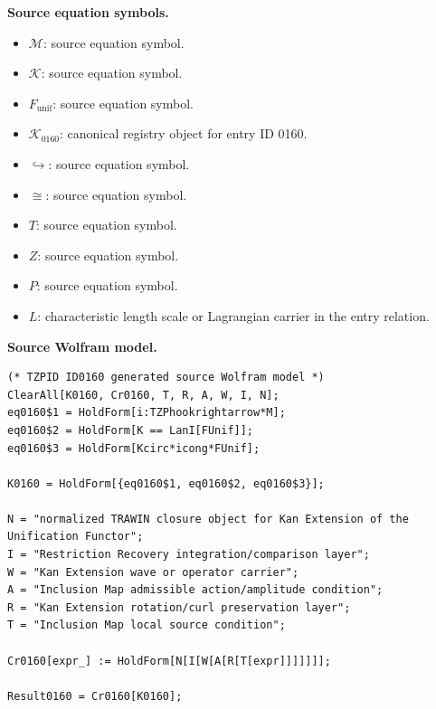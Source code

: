 \begin{minipage}[t]{0.49\linewidth}
\begingroup
\small
\raggedright
\textbf{Source equation symbols.}\par
\begin{itemize}[leftmargin=1.35em,itemsep=1pt,topsep=1pt,parsep=0pt]
    \item $\mathcal{M}$: source equation symbol.
    \item $\mathcal{K}$: source equation symbol.
    \item $F_{\mathrm{unif}}$: source equation symbol.
    \item $\mathcal{K}_{0160}$: canonical registry object for entry ID 0160.
    \item $\hookrightarrow$: source equation symbol.
    \item $\cong$: source equation symbol.
    \item $T$: source equation symbol.
    \item $Z$: source equation symbol.
    \item $P$: source equation symbol.
    \item $L$: characteristic length scale or Lagrangian carrier in the entry relation.
\end{itemize}
\endgroup
\end{minipage}\hfill
\begin{minipage}[t]{0.47\linewidth}
\begingroup
\scriptsize
\raggedright
\textbf{Source Wolfram model.}\par
\begin{Verbatim}[fontsize=\tiny,breaklines=true,breakanywhere=true]
(* TZPID ID0160 generated source Wolfram model *)
ClearAll[K0160, Cr0160, T, R, A, W, I, N];
eq0160$1 = HoldForm[i:TZPhookrightarrow*M];
eq0160$2 = HoldForm[K == LanI[FUnif]];
eq0160$3 = HoldForm[Kcirc*icong*FUnif];

K0160 = HoldForm[{eq0160$1, eq0160$2, eq0160$3}];

N = "normalized TRAWIN closure object for Kan Extension of the Unification Functor";
I = "Restriction Recovery integration/comparison layer";
W = "Kan Extension wave or operator carrier";
A = "Inclusion Map admissible action/amplitude condition";
R = "Kan Extension rotation/curl preservation layer";
T = "Inclusion Map local source condition";

Cr0160[expr_] := HoldForm[N[I[W[A[R[T[expr]]]]]]];

Result0160 = Cr0160[K0160];
\end{Verbatim}
\endgroup
\end{minipage}

